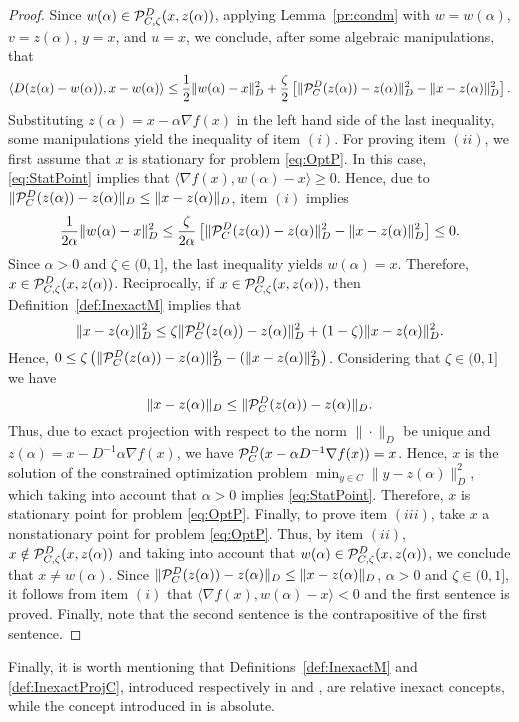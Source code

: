 \begin{proof}
	Since $w(\alpha) \in  {\cal P}_{C,\zeta}^{D}(x, z(\alpha))$, applying Lemma~\ref{pr:condm} with   $w=w(\alpha)$, $v=z(\alpha)$, $y=x$,  and $u=x$, we conclude,  after some algebraic manipulations,  that
	$$
		\left\langle D(z(\alpha)-w(\alpha)), x-w(\alpha) \right\rangle \leq 	\frac{1}{2} \|w(\alpha) -x\|_{D}^2 +   \frac{\zeta}{2} \left[\| {\cal P}_{C}^{D}(z(\alpha))-z(\alpha)\|_{D}^2 - \|x-z(\alpha)\|_{D}^2\right].
	$$
	Substituting  $z(\alpha) = x-\alpha \nabla f(x)$ in the left hand side of the last inequality,   some manipulations yield the inequality of item $(i)$.  For proving item $(ii)$, we first assume that $x$ is stationary for problem \eqref{eq:OptP}. In this case, \eqref{eq:StatPoint} implies that $\langle \nabla f(x), w(\alpha)-x \rangle \geq 0$. Hence,  due to $\|{\cal P}_{C}^{D}(z(\alpha))-z(\alpha)\|_{D}\leq  \|x-z(\alpha)\|_{D}$,   item $(i)$ implies
	$$
		\frac{1}{2\alpha} \|w(\alpha) -x\|_{D}^2 \leq    \frac{\zeta}{2\alpha} \left[\| {\cal P}_{C}^{D}(z(\alpha))-z(\alpha)\|_{D}^2 - \|x-z(\alpha)\|_{D}^2\right]\leq 0.
	$$
	Since $\alpha > 0$ and  $\zeta\in (0, 1]$, the last inequality  yields  $w(\alpha) = x$.  Therefore, $x \in {\cal P}_{C,\zeta}^{D}(x, z(\alpha))$. Reciprocally, if  $x \in {\cal P}_{C,\zeta}^{D}(x, z(\alpha))$, then Definition~\ref{def:InexactM} implies that
	$$
		\|x-z(\alpha)\|_{D}^2\leq \zeta \| {\cal P}_{C}^{D}(z(\alpha))-z(\alpha)\|_{D}^2+(1-\zeta)\|x-z(\alpha)\|_{D}^2.
	$$
	Hence, $0\leq \zeta\left( \| {\cal P}_{C}^{D}(z(\alpha))-z(\alpha)\|_{D}^2-(\|x-z(\alpha)\|_{D}^2\right)$. Considering that  $\zeta\in (0, 1]$ we have
	$$
		\|x-z(\alpha)\|_{D}\leq\| {\cal P}_{C}^{D}(z(\alpha))-z(\alpha)\|_{D}.
	$$
	Thus, due to  exact projection  with respect to the norm $\| \cdot \| _{D}$   be unique and $z(\alpha) = x-D^{-1} \alpha \nabla f(x)$,   we have    ${\cal P}_{C}^{D}( x-\alpha D^{-1} \nabla f(x))=x$. Hence, $x$ is the  solution of the constrained optimization problem $  \min _{y\in C}  \|y-z(\alpha)\| ^{2}_{D}$,
	which taking into account that  $\alpha > 0$ implies \eqref{eq:StatPoint}. Therefore, $x$ is stationary point for problem \eqref{eq:OptP}. Finally, to prove item $(iii)$, take $x$ a nonstationary point for problem \eqref{eq:OptP}. Thus, by item $(ii)$, $x \notin  {\cal P}_{C,\zeta}^{D}(x, z(\alpha))$ and taking into account that $w(\alpha) \in  {\cal P}_{C,\zeta}^{D}(x, z(\alpha))$, we conclude that $x \neq w(\alpha)$. Since $\|{\cal P}_{C}^{D}(z(\alpha))-z(\alpha)\|_{D}\leq  \|x-z(\alpha)\|_{D}$, $\alpha > 0$ and $\zeta\in (0, 1]$, it follows from item $(i)$ that $\Big\langle \nabla f(x), w(\alpha) - x \Big\rangle < 0$ and the first sentence is proved. Finally, note that the second sentence is the contrapositive of the first sentence.
\end{proof}
Finally, it is worth mentioning that Definitions~\ref{def:InexactM} and \ref{def:InexactProjC}, introduced respectively in \cite{BirginMartinezRaydan2003} and \cite{OrizonFabianaGilson2018},  are relative inexact  concepts, while the concept introduced in \cite{SalzoVilla2012,VillaSalzo2013} is absolute.



